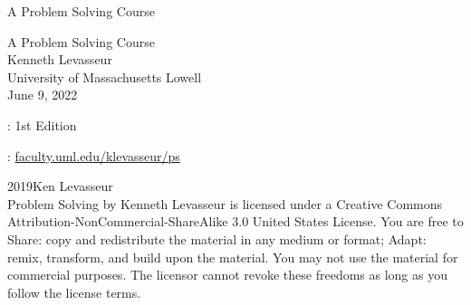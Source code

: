 \documentclass[twoside,10pt,]{book}
\newcommand{\titlepagefont}{\relax}
\numberwithin{equation}{section}
\begin{document}
\raggedbottom
\frontmatter
\thispagestyle{empty}
{\titlepagefont\centering
\vspace*{0.28\textheight}
{\Huge A Problem Solving Course}\\}
\clearpage
\thispagestyle{empty}
\null%
\clearpage
\thispagestyle{empty}
{\titlepagefont\centering
\vspace*{0.14\textheight}
{\Huge A Problem Solving Course}\\[3\baselineskip]
{\Large Kenneth Levasseur}\\[0.5\baselineskip]
{\Large University of Massachusetts Lowell}\\[3\baselineskip]
{\Large June 9, 2022}\\}
\clearpage
\thispagestyle{empty}
\hypertarget{g:colophon:idm56961938416}{}
: 1st Edition\par\medskip
{}: \href{http:\slash{}\slash{}faculty.uml.edu\slash{}klevasseur\slash{}ps}{faculty.uml.edu\slash{}klevasseur\slash{}ps}\par\medskip
\noindent\textcopyright{}2019\quad{}Ken Levasseur\\[0.5\baselineskip]
Problem Solving by  Kenneth Levasseur is licensed under a Creative Commons Attribution-NonCommercial-ShareAlike 3.0 United States License. You are free to Share: copy and redistribute the material in any medium or format; Adapt: remix, transform, and build upon the material. You may not use the material for commercial purposes.  The licensor cannot revoke these freedoms as long as you follow the license terms.\par\medskip
{}
\null\clearpage
\setcounter{tocdepth}{1}
\renewcommand*\contentsname{Contents}
\tableofcontents
\mainmatter
%
%
\typeout{************************************************}
\typeout{************************************************}
%
\end{document}

